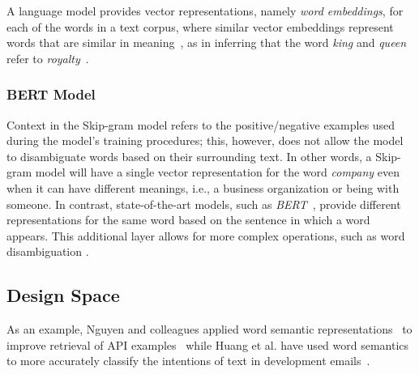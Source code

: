 
A language model provides  vector representations, namely \textit{word embeddings}, for each of the words in a text corpus, where similar vector embeddings represent words that are similar in meaning~\cite{Ye2016}, as in inferring that the word \textit{king} and \textit{queen} refer to \textit{royalty}~\cite{Mikolov2013}. 







\subsubsection{BERT Model}

Context in the Skip-gram model refers to the positive/negative examples used during the model's training procedures; this, however, does not allow the model to disambiguate words based on their surrounding text. In other words, a Skip-gram model will have a single vector representation for the word \textit{company} even when it can have different meanings, i.e., a business organization or being with someone. In contrast, state-of-the-art models, such as \textit{BERT}~\cite{Devlin2018Bert}, provide different representations for the same word based on the sentence in which a word appears.
This additional layer allows for more complex operations, such as word disambiguation .












  


\subsection{Design Space}
\label{cp5:design-space}









As an example, Nguyen and colleagues applied word semantic representations~\cite{Mikolov2013space} to improve  retrieval of API examples~\cite{nguyen2017} while Huang et al. have used word semantics 
to more accurately classify the intentions of text in development emails~\cite{huang2018automating}.



